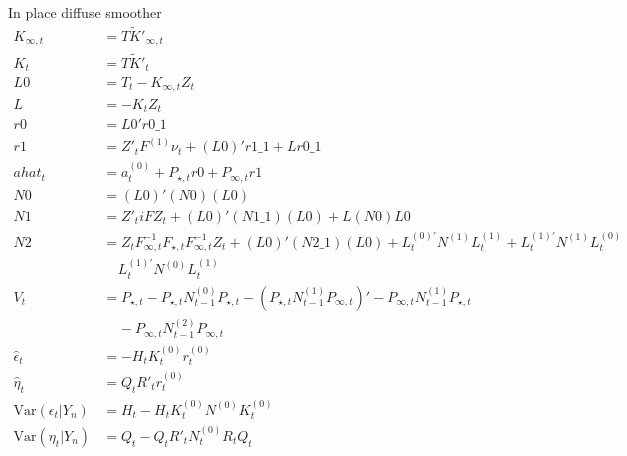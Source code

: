 \documentclass{article}
\begin{document}
In place diffuse smoother
\begin{align*}
  K_{\infty,t} &= T\tilde K'_{\infty,t} \\
  K_t &= T\tilde K'_t \\
  L0 &= T_t - K_{\infty,t}Z_t \\
  L &= - K_tZ_t \\
  r0 &= L0'r0\_1 \\
  r1 &= Z'_tF^{(1)}\nu_t + (L0)'r1\_1 +
                  Lr0\_1 \\
    ahat_t &= a^{(0)}_t + P_{\star,t}r0  +
             P_{\infty,t}r1 \\
  N0 &= (L0)'(N0)(L0) \\
  N1 &= Z'_tiFZ_t + (L0)'(N1\_1)(L0)
                  +L(N0)L0
                  \\
  N2 &= Z_tF^{-1}_{\infty,t}F_{\star,t}F^{-1}_{\infty,t}Z_t + (L0)'(N2\_1)(L0) +
                  L^{(0)'}_tN^{(1)}L^{(1)}_t +
                  L^{(1)'}_tN^{(1)}L^{(0)}_t \\
  &\;\;\;\;  L^{(1)'}_tN^{(0)}L^{(1)}_t \\
  V_t &= P_{\star,t} - P_{\star,t}N^{(0)}_{t-1}P_{\star,t} -
        (P_{\star,t}N^{(1)}_{t-1}P_{\infty,t})' -
        P_{\infty,t}N^{(1)}_{t-1}P_{\star,t}\\
  &\;\;\;\;-P_{\infty,t}N^{(2)}_{t-1}P_{\infty,t} \\
  \hat\epsilon_t &= -H_tK^{(0)}_tr^{(0)}_t \\
  \hat\eta_t &= Q_tR'_tr^{(0)}_t\\
  \mbox{Var}(\epsilon_t|Y_n) &= H_t - H_tK^{(0)}_tN^{(0)}K^{(0)}_t\\
  \mbox{Var}(\eta_t|Y_n) &= Q_t - Q_tR'_tN^{(0)}_tR_tQ_t \\
\end{align*}
\end{document}
